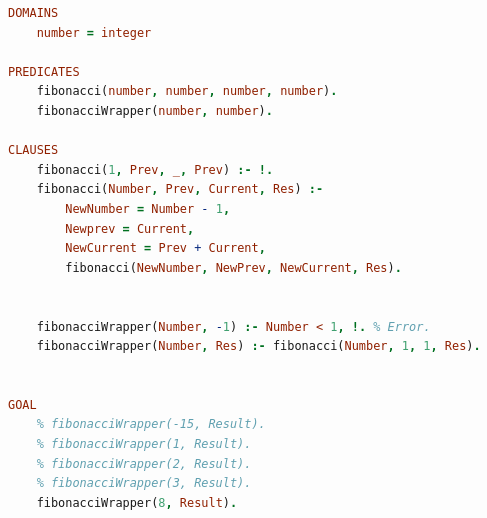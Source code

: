 \documentclass[a4paper,oneside,12pt]{extreport}
\begin{document}
\begin{task}
    \begin{figure}[ht!]
    \end{figure}

    \begin{figure}[ht!]
    \end{figure}
    
    \begin{figure}[ht!]
    \end{figure}

    \newpage

    \begin{lstlisting}[language=Prolog]
DOMAINS 
	number = integer

PREDICATES
	fibonacci(number, number, number, number).
	fibonacciWrapper(number, number).

CLAUSES
	fibonacci(1, Prev, _, Prev) :- !.
	fibonacci(Number, Prev, Current, Res) :-
		NewNumber = Number - 1,
		Newprev = Current,
		NewCurrent = Prev + Current,
		fibonacci(NewNumber, NewPrev, NewCurrent, Res).
	
	
	fibonacciWrapper(Number, -1) :- Number < 1, !. % Error.
	fibonacciWrapper(Number, Res) :- fibonacci(Number, 1, 1, Res).
	
	
GOAL
	% fibonacciWrapper(-15, Result).
	% fibonacciWrapper(1, Result).
	% fibonacciWrapper(2, Result).
	% fibonacciWrapper(3, Result).
	fibonacciWrapper(8, Result).
    \end{lstlisting}


\end{task}
\end{document}
